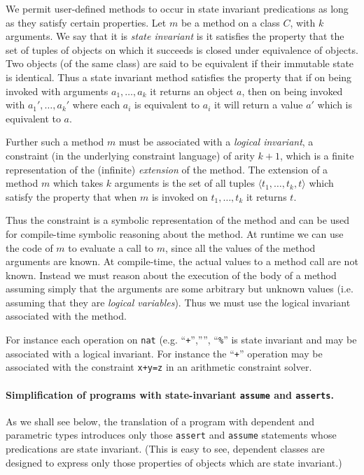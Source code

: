 \documentclass{article}
\begin{document}
We permit user-defined methods to occur in state invariant
predications as long as they satisfy certain properties.  Let $m$ be a
method on a class $C$, with $k$ arguments.  We say that it is {\em
state invariant} is it satisfies the property that the set of tuples
of objects on which it succeeds is closed under equivalence of
objects.  Two objects (of the same class) are said to be equivalent if
their immutable state is identical. Thus a state invariant method
satisfies the property that if on being invoked with arguments
$a_1,\ldots, a_k$ it returns an object $a$, then on being invoked with
$a_1', \ldots, a_k'$ where each $a_i$ is equivalent to $a_i$ it will
return a value $a'$ which is equivalent to $a$.

Further such a method $m$ must be associated with a {\em logical
invariant}, a constraint (in the underlying constraint language) of
arity $k+1$, which is a finite representation of the (infinite) {\em
extension} of the method. The extension of a method $m$ which takes
$k$ arguments is the set of all tuples $\langle t_1,\ldots, t_k,
t\rangle$ which satisfy the property that when $m$ is invoked on
$t_1,\ldots, t_k$ it returns $t$.  

Thus the constraint is a symbolic representation of the method and can
be used for compile-time symbolic reasoning about the method.  At
runtime we can use the code of $m$ to evaluate a call to $m$, since
all the values of the method arguments are known. At compile-time,
the actual values to a method call are not known. Instead we must 
reason about the execution of the body of a method assuming simply
that the arguments are some arbitrary but unknown values (i.e.{}
assuming that they are {\em logical variables}). Thus we must use
the logical invariant associated with the method. 

For instance each operation on {\tt nat} (e.g.{} ``{\tt +}'',''{\tt *}'',
``{\tt \%}'' is state invariant and may be associated with a logical
invariant. For instance the  ``{\tt +}'' operation may be associated
with the constraint {\tt x+y=z} in an arithmetic constraint solver. 

\paragraph{Simplification of programs with state-invariant {\tt assume} and {\tt asserts}.}

As we shall see below, the translation of a program with dependent and
parametric types introduces only those {\tt assert} and {\tt assume}
statements whose predications are state invariant. (This is easy to
see, dependent classes are designed to express only those properties
of objects which are state invariant.)
\end{document}
